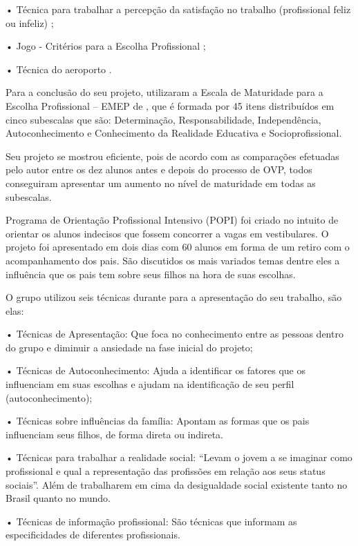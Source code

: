\documentclass[
	12pt,				%
    oneside,			%
	a4paper,			%
	english,			%
	french,				%
	spanish,			%
	brazil,				%
	]{abntex2}
\begin{document}
•	Técnica para trabalhar a percepção da satisfação no trabalho (profissional feliz ou infeliz) \cite{soares2010tecnicas}; 

•	Jogo - Critérios para a Escolha Profissional \cite{neiva2003criterios};

•	Técnica do aeroporto \cite{lucchiari1993pensando}.

Para a conclusão do seu projeto,  utilizaram a Escala de Maturidade para a Escolha Profissional – EMEP de , que é formada por 45 itens distribuídos em cinco subescalas que são: Determinação, Responsabilidade, Independência, Autoconhecimento e Conhecimento da Realidade Educativa e Socioprofissional. 

Seu projeto se mostrou eficiente, pois de acordo com as comparações efetuadas pelo autor entre os dez alunos antes e depois do processo de OVP, todos conseguiram apresentar um aumento no nível de maturidade em todas as subescalas. 

Programa de Orientação Profissional Intensivo (POPI) foi criado no intuito de orientar os alunos indecisos que fossem concorrer a vagas em vestibulares. O projeto foi apresentado em dois dias com 60 alunos em forma de um retiro com o acompanhamento dos pais. São discutidos os mais variados temas dentre eles a influência que os pais tem sobre seus filhos na hora de suas escolhas. 

O grupo utilizou seis técnicas durante para a apresentação do seu trabalho, são elas:

•	Técnicas de Apresentação: Que foca no conhecimento entre as pessoas dentro do grupo e diminuir a ansiedade na fase inicial do projeto;

•	Técnicas de Autoconhecimento: Ajuda a identificar os fatores que os influenciam em suas escolhas e ajudam na identificação de seu perfil (autoconhecimento);

•	Técnicas sobre influências da família: Apontam as formas que os pais influenciam seus filhos, de forma direta ou indireta.

•	Técnicas para trabalhar a realidade social: \cite{popi} \enquote{Levam o jovem a se imaginar como profissional e qual a representação das profissões em relação aos seus status sociais}. Além de trabalharem em cima da desigualdade social existente tanto no Brasil quanto no mundo.

•	Técnicas de informação profissional: São técnicas que informam as especificidades de diferentes profissionais.
\end{document}
